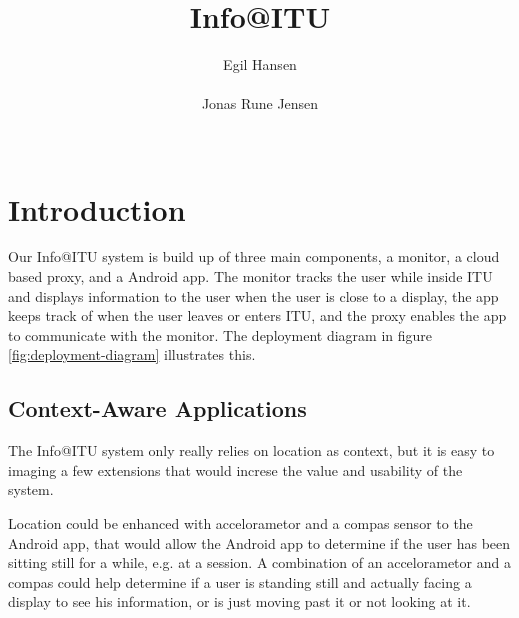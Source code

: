 \documentclass{ubicomp2011}
\begin{document}
\setlength{\paperheight}{11in}
\setlength{\paperwidth}{8.5in}
\setlength{\pdfpageheight}{\paperheight}
\setlength{\pdfpagewidth}{\paperwidth}

\toappear{}



\title{Info@ITU}
\author{
  \alignauthor Egil Hansen\\
    \\
 \alignauthor Jonas Rune Jensen\\
    \\
    }

\maketitle

\section{Introduction}

Our Info@ITU system is build up of three main components, a monitor, a cloud based proxy, and a Android app. The monitor tracks the user while inside ITU and displays information to the user when the user is close to a display, the app keeps track of when the user leaves or enters ITU, and the proxy enables the app to communicate with the monitor. The deployment diagram in figure \ref{fig:deployment-diagram} illustrates this.

\subsection{Context-Aware Applications}
The Info@ITU system only really relies on location as context, but it is easy to imaging a few extensions that would increse the value and usability of the system.

Location could be enhanced with accelorametor and a compas sensor to the Android app, that would allow the Android app to determine if the user has been sitting still for a while,
e.g. at a session. A combination of an accelorametor and a compas could help determine if a user is standing still and actually facing a display to see his information, or is just moving past it or not looking at it.
\end{document}
